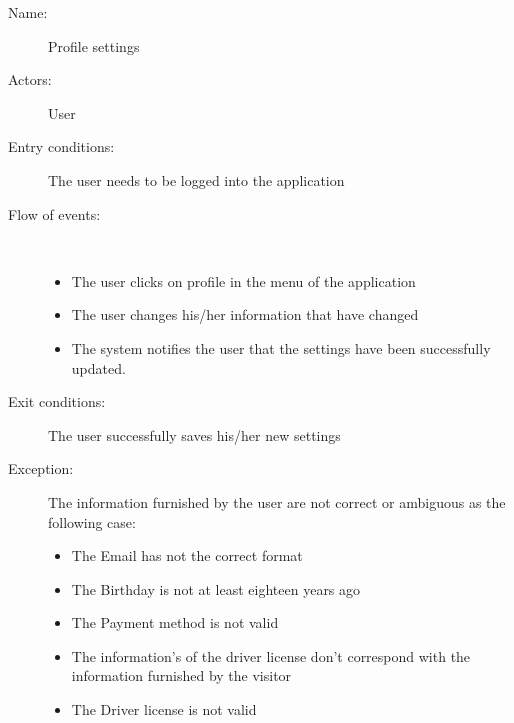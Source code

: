 \begin{description}
	\item[Name:] Profile settings
	\item[Actors:] User 
	\item[Entry conditions:] The user needs to be logged into the application
	\item[Flow of events:]  \ \\
		\begin{itemize}
			\item The user clicks on profile in the menu of the application
			\item The user changes his/her information that have changed
			\item The system notifies the user that the settings have been successfully updated.
		\end{itemize}
	\item[Exit conditions:] The user successfully saves his/her new settings
	\item [Exception:] The information furnished by the user are not correct or ambiguous as the following case:
		\begin{itemize}
			\item The Email has not the correct format
			\item The Birthday is not at least eighteen years ago
			\item The Payment method is not valid
			\item The information's of the driver license don't correspond with the information furnished by the visitor
			\item The Driver license is not valid
		\end {itemize}
\end{description}
